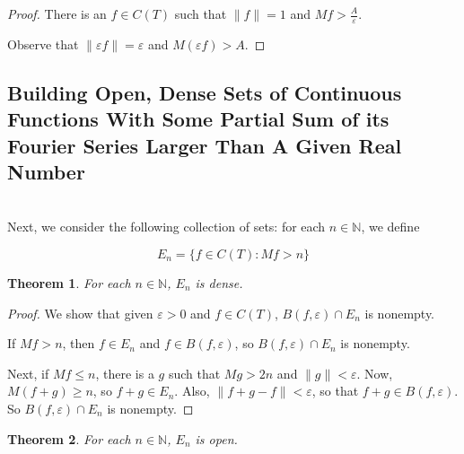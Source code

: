 \documentclass{amsart}
\newcommand{\vep}{\varepsilon}
\newcommand{\N}{\mathbb{N}}
\newcommand{\norm}[1]{\|#1\|}
\newtheorem{thm}{Theorem}[section]
\theoremstyle{definition}
\begin{document}
\begin{proof}
There is an $f \in C(T)$ such that $\norm{f} = 1$ and $Mf > \frac{A}{\vep}$.

Observe that $\norm{\vep f} = \vep$ and $M(\vep f) > A$.

\end{proof}

\subsection{Building Open, Dense Sets of Continuous Functions With Some Partial Sum of its Fourier Series Larger Than A Given Real Number} \hspace*{\fill}\\

Next, we consider the following collection of sets: for each $n \in \N$, we define

\begin{displaymath}
E_n = \{f \in C(T) : Mf > n\}
\end{displaymath}

\begin{thm}
For each $n \in \N$, $E_n$ is dense.
\end{thm}

\begin{proof}

We show that given $\vep>0$ and $f \in C(T)$, $B(f,\vep) \cap E_n$ is nonempty. 

If $Mf > n$, then $f \in E_n$ and $f \in B(f, \vep)$, so $B(f, \vep) \cap E_n$ is nonempty.

Next, if $Mf \leq n$, there is a $g$ such that $Mg > 2n$ and $\norm{g} < \vep$. 
Now, $M(f+g) \geq n$, so $f+g \in E_n$. 
Also, $\norm{f+g -f} < \vep$, so that $f+g \in B(f, \vep)$. 
So $B(f, \vep) \cap E_n$ is nonempty.

\end{proof}

\begin{thm}
For each $n \in \N$, $E_n$ is open.
\end{thm}
\end{document}
